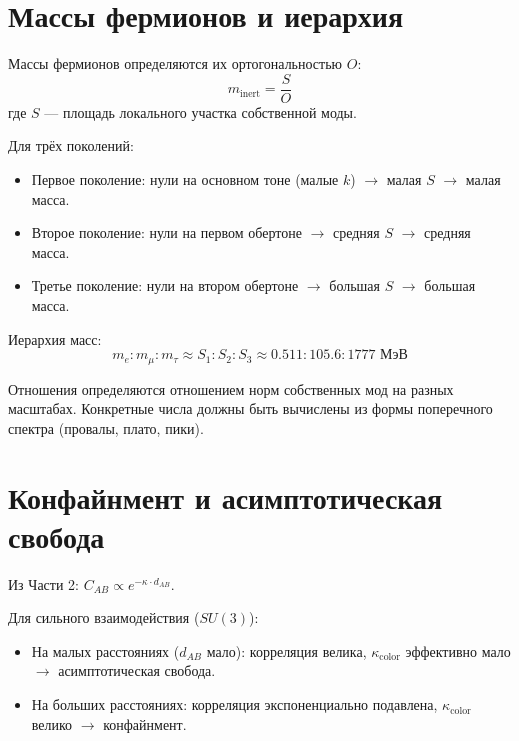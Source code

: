 \documentclass[11pt,a4paper]{article}
\theoremstyle{definition}
\begin{document}
\section{Массы фермионов и иерархия}

Массы фермионов определяются их ортогональностью $O$:
\begin{equation}
    m_{\text{inert}} = \frac{S}{O}
\end{equation}
где $S$ — площадь локального участка собственной моды.

Для трёх поколений:
\begin{itemize}
    \item Первое поколение: нули на основном тоне (малые $k$) $\to$ малая $S$ $\to$ малая масса.
    \item Второе поколение: нули на первом обертоне $\to$ средняя $S$ $\to$ средняя масса.
    \item Третье поколение: нули на втором обертоне $\to$ большая $S$ $\to$ большая масса.
\end{itemize}

Иерархия масс:
\begin{equation}
    m_e : m_\mu : m_\tau \approx S_1 : S_2 : S_3 \approx 0.511 : 105.6 : 1777 \text{ МэВ}
\end{equation}

Отношения определяются отношением норм собственных мод на разных масштабах. Конкретные числа должны быть вычислены из формы поперечного спектра (провалы, плато, пики).

\section{Конфайнмент и асимптотическая свобода}

Из Части 2: $C_{AB} \propto e^{-\kappa \cdot d_{AB}}$.

Для сильного взаимодействия ($SU(3)$):
\begin{itemize}
    \item На малых расстояниях ($d_{AB}$ мало): корреляция велика, $\kappa_{\text{color}}$ эффективно мало $\to$ асимптотическая свобода.
    \item На больших расстояниях: корреляция экспоненциально подавлена, $\kappa_{\text{color}}$ велико $\to$ конфайнмент.
\end{itemize}
\end{document}
